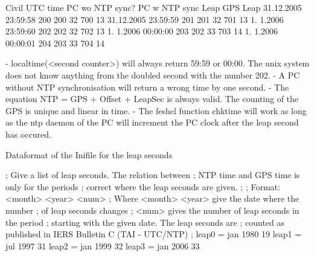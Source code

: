 \begin{DoxyVerb}    Civil UTC time       PC wo NTP sync?   PC w NTP sync    Leap     GPS  Leap
    31.12.2005 23:59:58        200             200           32      700   13
    31.12.2005 23:59:59        201             201           32      701   13
     1. 1.2006 23:59:60        202             202           32      702   13
     1. 1.2006 00:00:00        203             202           33      703   14
     1. 1.2006 00:00:01        204             203           33      704   14
\end{DoxyVerb}
 \begin{DoxyVerb}- localtime(<second counter>) will always return 59:59 or 00:00.
  The unix system does not know anything from the doubled second with the
  number 202.
- A PC without NTP synchronisation will return a wrong time by one second.
- The equation NTP = GPS + Offset + LeapSec is always valid.
  The counting of the GPS is unique and linear in time. 
- The feshel function chktime will work as long as the 
  ntp daemon of the PC will increment the PC clock after the leap
  second has occured. 

Dataformat of the Inifile for the leap seconds
\end{DoxyVerb}
 \begin{DoxyVerb}[GPSTime]
; Give a list of leap seconds. The relation between
; NTP time and GPS time is only for the periods
; correct where the leap seconds are given.
;
; Format: <month> <year> <num>
; Where <month> <year> give the date where the number
; of leap seconds changes
; <num> gives the number of leap seconds in the period
; starting with the given date. The leap seconds are
; counted as published in IERS Bulletin C (TAI - UTC/NTP)
;
leap0 = jan 1980 19
leap1 = jul 1997 31
leap2 = jan 1999 32
leap3 = jan 2006 33
\end{DoxyVerb}
 